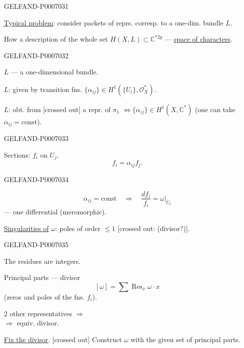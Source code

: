 \begin{GelfandAdjacentEvidence}{GELFAND-P000703}{1}

\underline{Typical problem}: consider packets of reprs. corresp. to a one-dim. bundle \(L\).

How a description of the whole set \(H(X,L)\subset\mathbb C^{*2g}\) --- \underline{space of characters}.
\end{GelfandAdjacentEvidence}
\begin{GelfandAdjacentEvidence}{GELFAND-P000703}{2}


\(L\) --- a one-dimensional bundle.

\(L\): given by transition fns. \(\{\alpha_{ij}\}\in H^1(\{U_i\},\mathcal O_X^*)\).

\(L\): obt. from [crossed out] a repr. of \(\pi_1\)
\(\Leftrightarrow \{\alpha_{ij}\}\in H^1(X,\mathbb C^*)\)
(one can take \(\alpha_{ij}=\mathrm{const}\)).
\end{GelfandAdjacentEvidence}
\begin{GelfandAdjacentEvidence}{GELFAND-P000703}{3}


Sections: \(f_i\) on \(U_j\).
\[
f_i=\alpha_{ij}f_j.
\]
\end{GelfandAdjacentEvidence}
\begin{GelfandAdjacentEvidence}{GELFAND-P000703}{4}

\[
\alpha_{ij}=\mathrm{const}\quad\Rightarrow\quad
\frac{df_i}{f_i}=\omega\big|_{U_i}
\]
--- one differential (meromorphic).

\underline{Singularities of} \(\omega\): poles of order \(\le 1\) [crossed out: (divisor?)].
\end{GelfandAdjacentEvidence}
\begin{GelfandAdjacentEvidence}{GELFAND-P000703}{5}


The residues are integers.

Principal parts --- divisor
\[
[\omega]=\sum\operatorname{Res}_x\omega\cdot x
\]
(zeros and poles of the fns. \(f_i\)).

2 other representatives \(\Rightarrow\)\\
\(\Rightarrow\) equiv. divisor.

\underline{Fix the divisor}. [crossed out] Construct \(\omega\) with the given set of principal parts.
\end{GelfandAdjacentEvidence}
